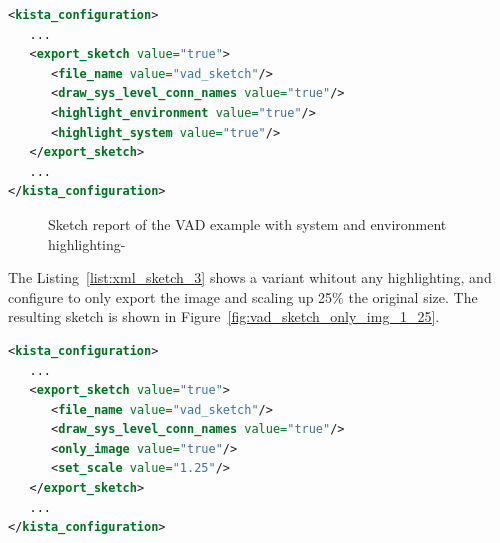 \begin{lstlisting}[language=XML, caption={Hilighting the environment and the system from the XML interface.}, label=list:xml_sketch_2]
<kista_configuration>
   ...
   <export_sketch value="true">
      <file_name value="vad_sketch"/>
      <draw_sys_level_conn_names value="true"/>
      <highlight_environment value="true"/>
      <highlight_system value="true"/>
   </export_sketch>	
   ...
</kista_configuration>
\end{lstlisting}

\begin{figure}[h]
\centering
\caption{Sketch report of the VAD example with system and environment highlighting-} 
\label{fig:vad_sketch_2}
\end{figure}


The Listing~\ref{list:xml_sketch_3} shows a variant whitout any highlighting, and 
configure to only export the image and scaling up 25\% the original size.
The resulting sketch is shown in Figure~\ref{fig:vad_sketch_only_img_1_25}.

\begin{lstlisting}[language=XML, caption={Configuring and only image sketch and its scale from the XML interface.}, label=list:xml_sketch_3]
<kista_configuration>
   ...
   <export_sketch value="true">
      <file_name value="vad_sketch"/>
      <draw_sys_level_conn_names value="true"/>
      <only_image value="true"/>
      <set_scale value="1.25"/>
   </export_sketch>	
   ...
</kista_configuration>
\end{lstlisting}

